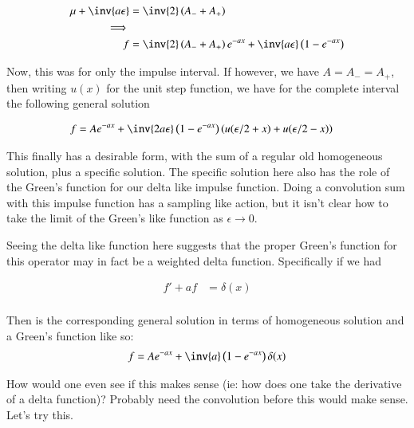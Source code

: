 \begin{align*}
\mu + \inv{a\epsilon} &= \inv{2}\left(A_{-} + A_{+}\right) \\
\implies \\
f &= \inv{2}\left(A_{-} + A_{+}\right) e^{-ax} + \inv{a \epsilon} \left(1 - e^{-a x}\right)
\end{align*}

Now, this was for only the impulse interval.  If however, we have $A = A_{-} = A_{+}$, then writing $u(x)$ for the unit step function, we have for the complete interval the following general solution

\begin{align*}
f &= A e^{-ax} + \inv{2 a \epsilon} \left(1 - e^{-a x}\right)\left( u(\epsilon/2 + x) + u(\epsilon/2 -x)\right)
\end{align*}

This finally has a desirable form, with the sum of a regular old homogeneous solution, plus a specific solution.  The specific solution here also has the role of the Green's function for our delta like impulse function.  Doing a convolution sum with this impulse function has a sampling like action, but it isn't clear how to take the
limit of the Green's like function as $\epsilon \rightarrow 0$.

Seeing the delta like function here suggests that the proper Green's function for this operator may in fact be a weighted delta function.  Specifically if we had

\begin{align*}
f' + a f &= \delta(x) \\
\end{align*}

Then is the corresponding general solution in terms of homogeneous solution and a Green's function like so:
\begin{align*}
f &= A e^{-ax} + \inv{a} \left(1 - e^{-a x}\right) \delta(x) \\
\end{align*}

How would one even see if this makes sense (ie: how does one take the derivative of a delta function)?  Probably need the convolution before this would make sense.  Let's try this.

%
%

%
